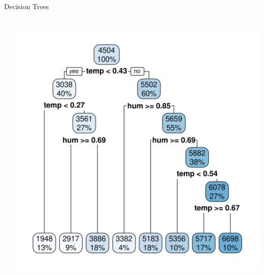 \documentclass[11pt,compress,t,notes=noshow, aspectratio=169, xcolor=table]{beamer}
\begin{document}


\begin{frame}{Decision Trees}

\begin{columns}[T]
  \begin{column}{0.5\textwidth}
     \tiny
     
  \end{column}
  \begin{column}{0.5\textwidth}
      \includegraphics[width = \textwidth]{figure/rpart_plot.png}
  \end{column}
\end{columns}

\end{frame}
\end{document}
